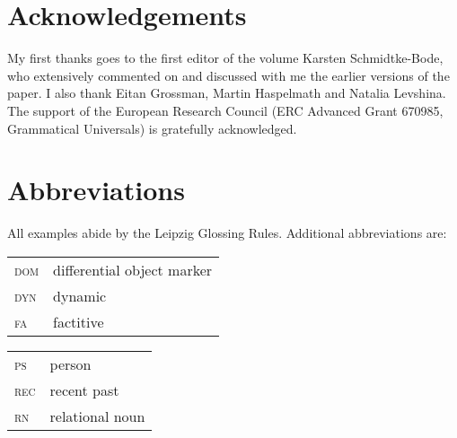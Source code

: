 \documentclass[output=paper]{langsci/langscibook}
\begin{document}
\section*{Acknowledgements} 

My first thanks goes to the first editor of the volume Karsten Schmidtke-Bode, who extensively commented on and discussed with me the earlier versions of the paper. I also thank Eitan Grossman, Martin Haspelmath and Natalia Levshina. The support of the European Research Council (ERC Advanced Grant 670985, Grammatical Universals) is gratefully acknowledged.

\section*{Abbreviations} 

 All examples abide by the Leipzig Glossing Rules. Additional abbreviations are:\medskip 

\begin{tabularx}{.45\textwidth}{lQ}
\textsc{dom}  &  differential object marker                 \\
\textsc{dyn} & {dynamic}                          \\
\textsc{fa}   &  factitive                  \\
\end{tabularx}
\begin{tabularx}{.45\textwidth}{lQ}
\textsc{ps} &  {person} \\
\textsc{rec} &  recent past \\
\textsc{rn} &  relational noun \\
\end{tabularx}
 
\sloppy
\printbibliography[heading=subbibliography,notkeyword=this] 
\end{document}
